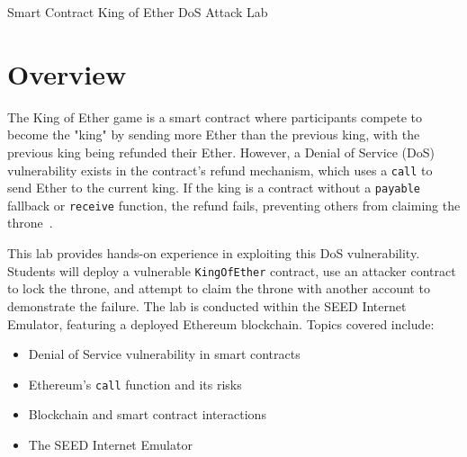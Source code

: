\newcommand{\commonfolder}{../../common-files}




\setlength{\headheight}{13.6pt}



\newcommand{\pointupright}[1]{\ding{218} \textbf{\texttt{#1}}}



\begin{center}
{\LARGE Smart Contract King of Ether DoS Attack Lab}
\end{center}


\section{Overview}

The King of Ether game is a smart contract where participants compete to become the "king" by sending more Ether than the previous king, with the previous king being refunded their Ether. However, a Denial of Service (DoS) vulnerability exists in the contract’s refund mechanism, which uses a \texttt{call} to send Ether to the current king. If the king is a contract without a \texttt{payable} fallback or \texttt{receive} function, the refund fails, preventing others from claiming the throne~\cite{CyfrinDoS}.

This lab provides hands-on experience in exploiting this DoS vulnerability. Students will deploy a vulnerable \texttt{KingOfEther} contract, use an attacker contract to lock the throne, and attempt to claim the throne with another account to demonstrate the failure. The lab is conducted within the SEED Internet Emulator, featuring a deployed Ethereum blockchain. Topics covered include:

\begin{itemize}[noitemsep]
    \item Denial of Service vulnerability in smart contracts
    \item Ethereum’s \texttt{call} function and its risks
    \item Blockchain and smart contract interactions
    \item The SEED Internet Emulator
\end{itemize}

